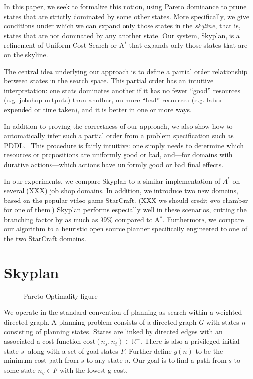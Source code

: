 \documentclass[letterpaper]{article}
\theoremstyle{plain} \newtheorem{theorem}{Theorem} \newtheorem{proposition}{Proposition} \newtheorem{lemma}{Lemma}
\theoremstyle{definition} \newtheorem{definition}{Definition} \newtheorem{conjecture}{Conjecture} \newtheorem*{example}{Example}
\theoremstyle{remark} \newtheorem*{remark}{Remark} \newtheorem*{note}{Note} \newtheorem{case}{Case}
\begin{document}
In this paper, we seek to formalize this notion, using Pareto
dominance to prune states that are strictly dominated by some other
states. More specifically, we give conditions under which we can
expand only those states in the \textit{skyline}, that is, states
that are not dominated by any another state. Our system, Skyplan,
is a refinement of Uniform Cost Search or A$^*$ that expands only
those states that are on the skyline.

The central idea underlying our approach is to define a partial
order relationship between states in the search space. This partial
order has an intuitive interpretation: one state dominates another
if it has no fewer ``good'' resources (e.g. jobshop outputs) than
another, no more ``bad'' resources (e.g. labor expended or time
taken), and it is better in one or more ways. 

In addition to proving the correctness of our approach, we also
show how to automatically infer such a partial order from a problem
specification such as PDDL.~\cite{ghallab1998pddl,fox2003pddl2}
This procedure is fairly intuitive: one simply needs to determine
which resources or propositions are uniformly good or bad, and---for 
domains with durative actions---which actions have uniformly
good or bad final effects.

In our experiments, we compare Skyplan to a similar implementation
of $A^*$ on several (XXX) job shop domains. In addition, we introduce
two new domains, based on the popular video game StarCraft. (XXX
we should credit evo chamber for one of them.) Skyplan performs
especially well in these scenarios, cutting the branching factor
by as much as 99\% compared to A$^*$.  Furthermore, we compare our
algorithm to a heuristic open source planner specifically engineered
to one of the two StarCraft domains.

\section{Skyplan}

\begin{figure}
  \caption{Pareto Optimality figure}
\end{figure}

We operate in the standard convention of planning as search within
a weighted directed graph.  A planning problem consists of a directed
graph $G$ with states $n$ consisting of planning states.  States are
linked by directed edges with an associated a cost function
$\mathrm{cost}(n_s,n_t) \in \mathbb R^+$.  There is also a privileged
initial state $s$, along with a set of goal states $F$.  Further
define $g(n)$ to be the minimum cost path from $s$ to any state $n$.
Our goal is to find a path from $s$ to some state $n_g \in F$ with
the lowest g cost.
\end{document}
